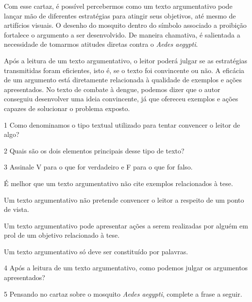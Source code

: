 {Com esse cartaz, é possível percebermos como um texto argumentativo pode lançar mão de
diferentes estratégias para atingir seus objetivos, até mesmo de
artifícios visuais. O desenho do mosquito dentro do
símbolo associado a proibição fortalece o argumento a ser desenvolvido.
De maneira chamativa, é salientada a necessidade de tomarmos atitudes diretas contra o
\textit{Aedes aegypti}.

Após a leitura de um texto argumentativo, o leitor poderá julgar se as
estratégias transmitidas foram eficientes, isto é, se o texto foi
convincente ou não. A eficácia de um argumento está diretamente
relacionada à qualidade de exemplos e ações apresentados. No texto de
combate à dengue, podemos dizer que o autor conseguiu desenvolver uma
ideia convincente, já que ofereceu exemplos e ações capazes de
solucionar o problema exposto.}

\pagebreak
{}

\num{1} Como denominamos o tipo textual utilizado para tentar convencer o leitor
de algo?


\num{2} Quais são os dois elementos principais desse tipo de texto?


\num{3} Assinale V para o que for verdadeiro e F para o que for falso.

\begin{boxlist}
 É melhor que um texto argumentativo não cite exemplos relacionados à tese.

 Um texto argumentativo não pretende convencer o leitor a respeito de
um ponto de vista.

 Um texto argumentativo pode apresentar ações a serem realizadas por alguém em prol de um objetivo relacionado à tese.

 Um texto argumentativo só deve ser constituído por palavras.
\end{boxlist}

\num{4} Após a leitura de um texto argumentativo, como podemos julgar os argumentos apresentados?


\num{5} Pensando no cartaz sobre o mosquito \textit{Aedes aegypti}, complete a frase a seguir.


